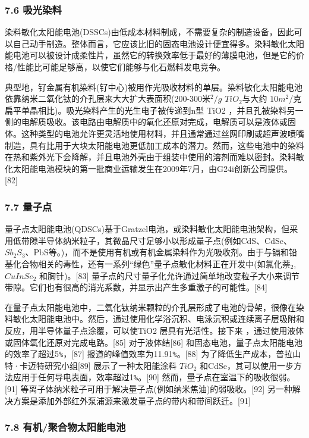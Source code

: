 \subsubsection{7.6 吸光染料}

染料敏化太阳能电池(DSSCs)由低成本材料制成，不需要复杂的制造设备，因此可以自己动手制造。整体而言，它应该比旧的固态电池设计便宜得多。染料敏化太阳能电池可以被设计成柔性片，虽然它的转换效率低于最好的薄膜电池，但是它的价格/性能比可能足够高，以使它们能够与化石燃料发电竞争。

典型地，钌金属有机染料(钌中心)被用作光吸收材料的单层。染料敏化太阳能电池依靠纳米二氧化钛的介孔层来大大扩大表面积(200-300米$^2/g$ $TiO_2$与大约 $10 m^2$/克扁平单晶相比)。吸光染料产生的光生电子被传递到n型 TiO2 ，并且孔被染料另一侧的电解质吸收。该电路由电解质中的氧化还原对完成，电解质可以是液体或固体。这种类型的电池允许更灵活地使用材料，并且通常通过丝网印刷或超声波喷嘴制造，具有比用于大块太阳能电池更低加工成本的潜力。然而，这些电池中的染料在热和紫外光下会降解，并且电池外壳由于组装中使用的溶剂而难以密封。染料敏化太阳能电池模块的第一批商业运输发生在2009年7月，由G24i创新公司提供。[82]

\subsubsection{7.7 量子点}

量子点太阳能电池(QDSCs)基于Gratzel电池，或染料敏化太阳能电池架构，但采用低带隙半导体纳米粒子，其微晶尺寸足够小以形成量子点(例如CdS、CdSe、 $Sb_2S_3$、PbS等。)，而不是使用有机或有机金属染料作为光吸收剂。由于与镉和铅基化合物相关的毒性，还有一系列“绿色”量子点敏化材料正在开发中(如氯化萘$_2$, $CuInSe_2$ 和胸针)。[83] 量子点的尺寸量子化允许通过简单地改变粒子大小来调节带隙。它们也有很高的消光系数，并显示出产生多重激子的可能性。[84]

在量子点太阳能电池中，二氧化钛纳米颗粒的介孔层形成了电池的骨架，很像在染料敏化太阳能电池中。然后，通过使用化学浴沉积、电泳沉积或连续离子层吸附和反应，用半导体量子点涂覆，可以使TiO2 层具有光活性。接下来 ，通过使用液体或固体氧化还原对完成电路。[85] 对于液体结[86] 和固态电池，量子点太阳能电池的效率了超过5\verb|%|，[87] 报道的峰值效率为11.91\verb|%|。[88] 为了降低生产成本，普拉山特·卡迈特研究小组[89] 展示了一种太阳能涂料 $TiO_2$ 和CdSe，其可以使用一步方法应用于任何导电表面，效率超过1\verb|%|。[90] 然而，量子点在室温下的吸收很弱。[91] 等离子体纳米粒子可用于解决量子点(例如纳米焦油)的弱吸收。[92] 另一种解决方案是添加外部红外泵浦源来激发量子点的带内和带间跃迁。[91]

\subsubsection{7.8 有机/聚合物太阳能电池}

